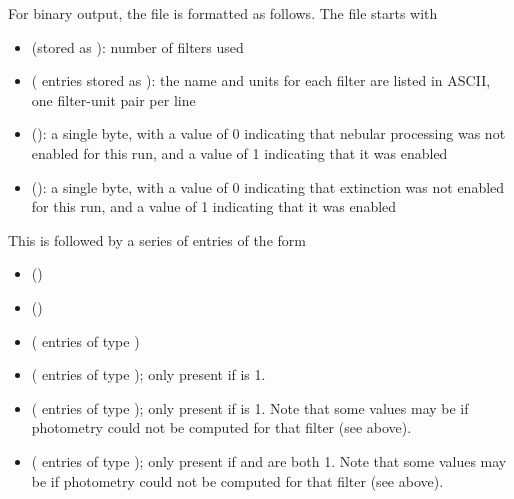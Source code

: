 \documentclass[letterpaper,10pt,english]{sphinxmanual}
\begin{document}
For binary output, the file is formatted as follows. The file starts with
\begin{itemize}
\item {} 
 (stored as ): number of filters used

\item {} 
  ( entries stored as ): the name and units for each filter are listed in ASCII, one
filter-unit pair per line

\item {} 
 (): a single byte, with a value of 0 indicating
that nebular processing was not enabled for this run, and a value of 1
indicating that it was enabled

\item {} 
 (): a single byte, with a value of 0 indicating
that extinction was not enabled for this run, and a value of 1
indicating that it was enabled

\end{itemize}

This is followed by a series of entries of the form
\begin{itemize}
\item {} 
 ()

\item {} 
 ()

\item {} 
 ( entries of type )

\item {} 
 ( entries of type ); only present if  is 1.

\item {} 
 ( entries of type ); only present if  is 1. Note that some values may be  if photometry could not be computed for that filter (see above).

\item {} 
 ( entries of type ); only present if  and  are both 1. Note that some values may be  if photometry could not be computed for that filter (see above).

\end{itemize}
\end{document}
